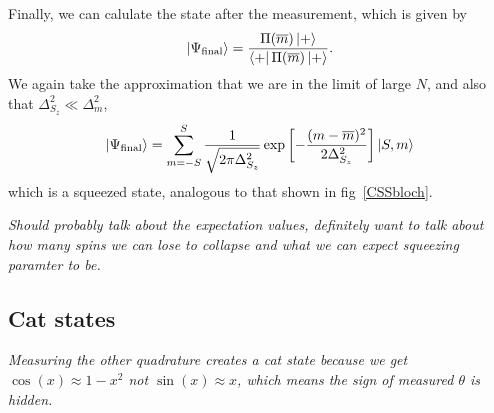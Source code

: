 \documentclass{article}
\newcommand*\meas[1]{\overline{#1}}
\begin{document}
Finally, we can calulate the state after the measurement, which is given
by~\cite{}
%
\begin{equation}
  \ket{\Psi_\text{final}} =
  \frac{\Pi(\meas{m})\ket{+}}{\bra{+}\Pi(\meas{m})\ket{+}}.
\end{equation}
%
We again take the approximation that we are in the limit of large $N$, and also
that $\Delta_{S_z}^2 \ll \Delta_m^2$,
%
\begin{equation}
  \ket{\Psi_\text{final}} = \sum_{m=-S}^S\frac{1}{\sqrt{2\pi\Delta_{S_z}^2}}
  \exp\left[-\frac{(m - \meas{m})^2}{2\Delta_{S_z}^2}\right] \ket{S,m}
\end{equation}
%
which is a squeezed state, analogous to that shown in fig~\ref{CSSbloch}.

\emph{Should probably talk about the expectation values, definitely want to
talk about how many spins we can lose to collapse and what we can expect
squeezing paramter to be.}

\subsection{Cat states}


\emph{Measuring the other quadrature creates a cat state because we get
$\cos(x) \approx 1 - x^2$ not $\sin(x)\approx x$, which means the sign of
measured $\theta$ is hidden.}

\end{document}
